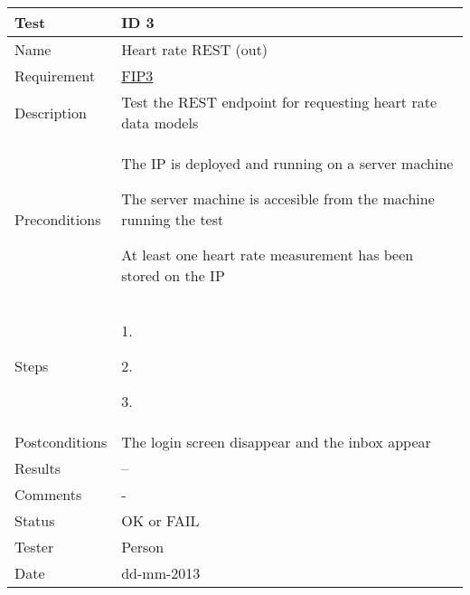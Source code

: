 \begin{table}
\begin{center}
\begin{tabular}{ | l | p{10cm} | }
	\hline
	\textbf{Test}	&	\textbf{ID 3} \\
	\hline\noalign{\smallskip}\noalign{\smallskip}\hline
	Name				& Heart rate REST (out) \\
	Requirement			& \hyperref[table:reqip]{FIP3} \\
	Description			& Test the REST endpoint for requesting heart rate data models \\
	Preconditions		&	\par The IP is deployed and running on a server machine
							\par The server machine is accesible from the machine running the test
							\par At least one heart rate measurement has been stored on the IP \\
	Steps 				&	\par 1. 
							\par 2. 
							\par 3.  \\
	Postconditions		& The login screen disappear and the inbox appear \\
	Results				& -- \\
	Comments			& - \\
	Status				& OK or FAIL \\
	Tester				& Person \\
	Date				& dd-mm-2013 \\
	\hline
\end{tabular}
\end{center}
\end{table}


